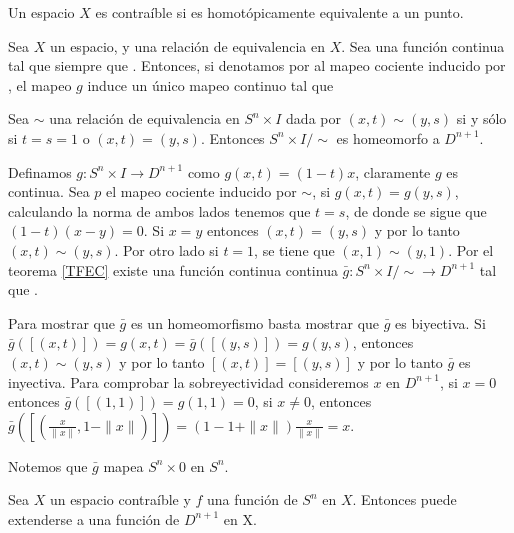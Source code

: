 \begin{Defi}
Un espacio $X$ es contraíble si es homotópicamente equivalente a un punto.
\end{Defi}

\begin{Teo}\label{TFEC}
Sea $X$ un espacio, y \mm{\sim} una relación de equivalencia en $X$. Sea  una función continua tal que  siempre que . Entonces, si denotamos por  al mapeo cociente inducido por \mm{\sim}, el mapeo $g$ induce un único mapeo continuo  tal que 
\end{Teo}
\begin{Lema}\label{lemah}
Sea $\sim$ una relación de equivalencia en $S^n\times I$ dada por $(x,t)\sim (y,s)$ si y sólo si $t = s = 1$ o $(x,t)=(y,s)$. Entonces $S^n\times I /\sim$ es homeomorfo a $D^{n+1}$.
\end{Lema}
\begin{Dem}

Definamos $g\colon S^n\times I\rightarrow D^{n+1}$ como $g(x,t) = (1-t)x$, claramente $g$ es continua. Sea $p$ el mapeo cociente inducido por $\sim$, si $g(x,t) = g(y,s)$, calculando la norma de ambos lados tenemos que  $t = s$, de donde se sigue que $(1-t)(x-y)=0$. Si $x = y$ entonces $(x,t) = (y,s)$ y por lo tanto $(x,t)\sim (y,s)$. Por otro lado si $t = 1$, se tiene que $(x,1)\sim(y,1)$.
Por el teorema \ref{TFEC} existe una función continua continua $\bar{g}\colon S^n\times I/\sim \rightarrow D^{n+1}$ tal que .

Para mostrar que $\bar{g}$ es un homeomorfismo basta mostrar que $\bar{g}$ es biyectiva.
Si  $\bar{g}([(x,t)]) =g(x,t)= \bar{g}([(y,s)]) = g(y,s)$, entonces $(x,t)\sim (y,s)$ y por lo tanto $[(x,t)] = [(y,s)]$ y por lo tanto $\bar{g}$ es inyectiva.
Para comprobar la sobreyectividad consideremos $x$ en $D^{n+1}$, si $x=0$ entonces $\bar{g}([(1,1)])= g(1,1) = 0$, si $x\neq 0$, entonces $\bar{g}([(\frac{x}{\parallel x\parallel},1-\parallel x\parallel)]) = (1-1+\parallel x\parallel)\frac{x}{\parallel x\parallel} = x$. 

Notemos que $\bar{g}$ mapea $S^n\times{0}$ en $S^n$.


\end{Dem}
\begin{Teo}
Sea $X$ un espacio contraíble y $f$ una función de $S^n$ en $X$. Entonces  puede extenderse a una función de $D^{n+1}$ en X.
\end{Teo}
 
